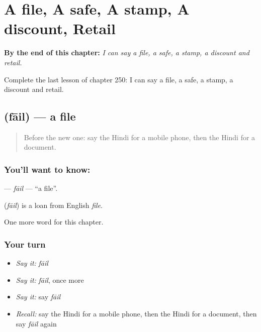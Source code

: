 
\chapter{A file, A safe, A stamp, A discount, Retail}
\label{ch:hi-a-file-a-safe-a-stamp-a-discount-retail}

\begin{chapteropening}
\textbf{By the end of this chapter:} \emph{I can say a file, a safe, a stamp, a discount and retail.}

Complete the last lesson of chapter 250: I can say a file, a safe, a stamp, a discount and retail.
\end{chapteropening}

\section[\texorpdfstring{\hi{फ़ाइल} (fāil)}{फ़ाइल (fāil)}]{ (fāil) — a file}

\label{lesson:HI-C250-fail}



\begin{quote}
Before the new one: say the Hindi for a mobile phone, then the Hindi for a document.
\end{quote}

\subsection*{You'll want to know: }
\textbf{} — \emph{fāil} — \textquotedblleft{}a file\textquotedblright{}.

\begin{cousinweb}
\textbf{} (\emph{fāil}) is a loan from English \emph{file}.
\end{cousinweb}

\begin{grammarlens}[title={What you've built}]
One more word for this chapter.
\end{grammarlens}

\subsection*{Your turn}
\begin{itemize}
\raggedright
  \item \emph{Say it:} \emph{fāil}
  \item \emph{Say it:} \emph{fāil}, once more
  \item \emph{Say it:} say \emph{fāil}
  \item \emph{Recall:} say the Hindi for a mobile phone, then the Hindi for a document, then say \emph{fāil} again
\end{itemize}

